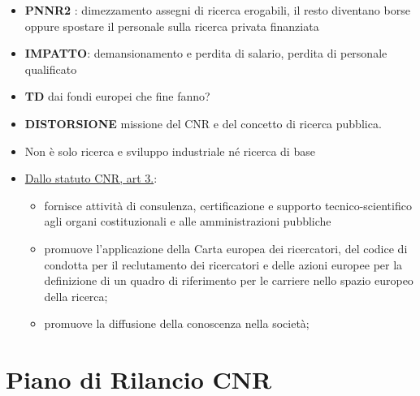 \documentclass[
  letterpaper,
  DIV=11,
  numbers=noendperiod]{scrartcl}
\begin{document}
\begin{itemize}
\item
  \textbf{PNNR2} : dimezzamento assegni di ricerca erogabili, il resto
  diventano borse oppure spostare il personale sulla ricerca privata
  finanziata
\item
  \textbf{IMPATTO}: demansionamento e perdita di salario, perdita di
  personale qualificato
\item
  \textbf{TD} dai fondi europei che fine fanno?
\item
  \textbf{DISTORSIONE} missione del CNR e del concetto di ricerca
  pubblica.
\item
  Non è solo ricerca e sviluppo industriale né ricerca di base
\item
  \href{https://www.cnr.it/sites/default/files/public/media/amministrazione_trasparente/Provvedimento_93-2018.pdf}{Dallo
  statuto CNR, art 3.}:

  \begin{itemize}
  \item
    fornisce attività di consulenza, certificazione e supporto
    tecnico-scientifico agli organi costituzionali e alle
    amministrazioni pubbliche
  \item
    promuove l'applicazione della Carta europea dei ricercatori, del
    codice di condotta per il reclutamento dei ricercatori e delle
    azioni europee per la definizione di un quadro di riferimento per le
    carriere nello spazio europeo della ricerca;
  \item
    promuove la diffusione della conoscenza nella società;
  \end{itemize}
\end{itemize}

\hypertarget{piano-di-rilancio-cnr}{%
\section{Piano di Rilancio CNR}\label{piano-di-rilancio-cnr}}

\hypertarget{section-2}{%
\subsection{}\label{section-2}}
\end{document}
